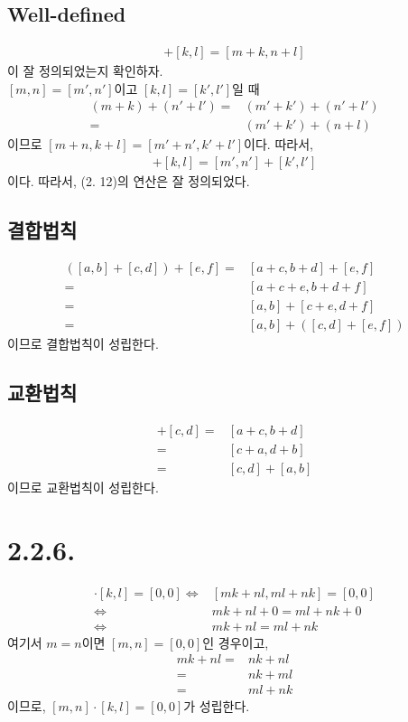 \documentclass{article}
\begin{document}
\subsection{Well-defined}
\begin{align*}
[m, n] + [k, l] = [m+k, n+l]
\end{align*}이 잘 정의되었는지 확인하자.
\\$[m, n] = [m', n']$이고 $[k, l] = [k', l']$일 때
\begin{align*}
(m+k)+(n'+l') =& (m'+k')+(n'+l') 
\\=& (m'+k')+(n+l) 
\end{align*}이므로 $[m+n, k+l] = [m'+n', k'+l']$이다. 따라서,
\begin{align*}
[m, n]+[k, l] = [m', n'] + [k', l']
\end{align*}이다. 따라서, (2. 12)의 연산은 잘 정의되었다.

\subsection{결합법칙}
\begin{align*}
([a, b] + [c, d]) + [e, f] =& [a+c, b+d] + [e, f]
\\ =& [a+c+e, b+d+f]
\\ =& [a, b] + [c+e, d+f]
\\ =& [a, b] + ([c, d] + [e, f])
\end{align*}이므로 결합법칙이 성립한다.

\subsection{교환법칙}
\begin{align*}
[a, b] + [c, d] =& [a+c, b+d]
\\ =& [c+a, d+b]
\\ =& [c, d] + [a, b]
\end{align*}이므로 교환법칙이 성립한다.


\section{2.2.6.}
\begin{align*}
[m, n] \cdot [k, l] = [0, 0] \iff& [mk + nl, ml + nk] = [0, 0]
\\ \iff& mk+nl+0 = ml+nk+0
\\ \iff& mk+nl = ml+nk
\end{align*}
여기서 $m = n$이면 $[m, n] = [0, 0]$인 경우이고,
\begin{align*}
mk+nl =& nk + nl
\\ =& nk + ml
\\ =& ml + nk
\end{align*}이므로, $[m, n] \cdot [k, l] = [0, 0]$가 성립한다.
\end{document}
